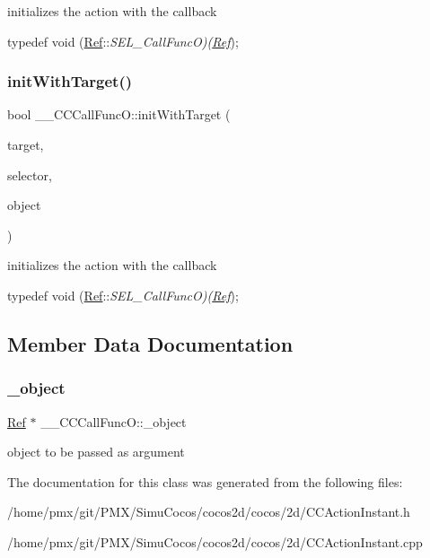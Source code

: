 initializes the action with the callback

typedef void (\hyperlink{classRef}{Ref}\+:\+:{\itshape S\+E\+L\+\_\+\+Call\+FuncO)(\hyperlink{classRef}{Ref}}); \mbox{\label{class____CCCallFuncO_ae295b34998b51d676c97cb71662443bb}} 
\subsubsection{\texorpdfstring{init\+With\+Target()}{initWithTarget()}\hspace{0.1cm}{\footnotesize\ttfamily [2/2]}}
{\footnotesize\ttfamily bool \+\_\+\+\_\+\+C\+C\+Call\+Func\+O\+::init\+With\+Target (\begin{DoxyParamCaption}\item[{\hyperlink{classRef}{Ref} $\ast$}]{target,  }\item[{S\+E\+L\+\_\+\+Call\+FuncO}]{selector,  }\item[{\hyperlink{classRef}{Ref} $\ast$}]{object }\end{DoxyParamCaption})}

initializes the action with the callback

typedef void (\hyperlink{classRef}{Ref}\+:\+:{\itshape S\+E\+L\+\_\+\+Call\+FuncO)(\hyperlink{classRef}{Ref}}); 

\subsection{Member Data Documentation}
\mbox{\label{class____CCCallFuncO_a445f552253c55eb32d26138ca02632e3}} 
\subsubsection{\texorpdfstring{\+\_\+object}{\_object}}
{\footnotesize\ttfamily \hyperlink{classRef}{Ref} $\ast$ \+\_\+\+\_\+\+C\+C\+Call\+Func\+O\+::\+\_\+object\hspace{0.3cm}{\ttfamily [protected]}}

object to be passed as argument 

The documentation for this class was generated from the following files\+:\begin{DoxyCompactItemize}
\item 
/home/pmx/git/\+P\+M\+X/\+Simu\+Cocos/cocos2d/cocos/2d/C\+C\+Action\+Instant.\+h\item 
/home/pmx/git/\+P\+M\+X/\+Simu\+Cocos/cocos2d/cocos/2d/C\+C\+Action\+Instant.\+cpp\end{DoxyCompactItemize}
